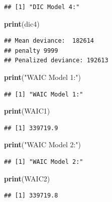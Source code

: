 \documentclass[
]{article}
\newenvironment{Shaded}{\begin{snugshade}}{\end{snugshade}}
\newcommand{\FunctionTok}[1]{\textcolor[rgb]{0.13,0.29,0.53}{\textbf{#1}}}
\newcommand{\NormalTok}[1]{#1}
\newcommand{\StringTok}[1]{\textcolor[rgb]{0.31,0.60,0.02}{#1}}
\begin{document}
\begin{verbatim}
## [1] "DIC Model 4:"
\end{verbatim}

\begin{Shaded}
\begin{Highlighting}[]
\FunctionTok{print}\NormalTok{(dic4)}
\end{Highlighting}
\end{Shaded}

\begin{verbatim}
## Mean deviance:  182614 
## penalty 9999 
## Penalized deviance: 192613
\end{verbatim}

\begin{Shaded}
\begin{Highlighting}[]
\FunctionTok{print}\NormalTok{(}\StringTok{"WAIC Model 1:"}\NormalTok{)}
\end{Highlighting}
\end{Shaded}

\begin{verbatim}
## [1] "WAIC Model 1:"
\end{verbatim}

\begin{Shaded}
\begin{Highlighting}[]
\FunctionTok{print}\NormalTok{(WAIC1)}
\end{Highlighting}
\end{Shaded}

\begin{verbatim}
## [1] 339719.9
\end{verbatim}

\begin{Shaded}
\begin{Highlighting}[]
\FunctionTok{print}\NormalTok{(}\StringTok{"WAIC Model 2:"}\NormalTok{)}
\end{Highlighting}
\end{Shaded}

\begin{verbatim}
## [1] "WAIC Model 2:"
\end{verbatim}

\begin{Shaded}
\begin{Highlighting}[]
\FunctionTok{print}\NormalTok{(WAIC2)}
\end{Highlighting}
\end{Shaded}

\begin{verbatim}
## [1] 339719.8
\end{verbatim}
\end{document}
